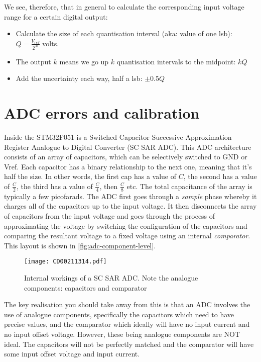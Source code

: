We see, therefore, that in general to calculate the corresponding input voltage range for a certain digital output:
\begin{itemize}
  \item Calculate the size of each quantisation interval (aka: value of one lsb): \(Q = \frac{V_{ref}}{2^M}\) volts.
  \item The output \(k\) means we go up \(k\) quantisation intervals to the midpoint: \(kQ\)
  \item Add the uncertainty each way, half a lsb: \(\pm 0.5Q\)
\end{itemize}

\section{ADC errors and calibration}
Inside the STM32F051 is a Switched Capacitor Successive Approximation Register Analogue to Digital Converter (SC SAR ADC). 
This ADC architecture consists of an array of capacitors, which can be selectively switched to GND or Vref. 
Each capacitor has a binary relationship to the next one, meaning that it's half the size. 
In other words, the first cap has a value of \(C\), the second has a value of \(\frac{C}{2}\), the third has a value of \(\frac{C}{4}\), then \(\frac{C}{8}\) etc.
The total capacitance of the array is typically a few picofarads. 
The ADC first goes through a \emph{sample} phase whereby it charges all of the capacitors up to the input voltage. It then disconnects the array of capacitors from the input voltage and goes through the process of approximating the voltage by switching the configuration of the capacitors and comparing the resultant voltage to a fixed voltage using an internal \emph{comparator}. This layout is shown in \autoref{fig:adc-component-level}. 

\begin{figure}
\centering
\texttt{[image: CD00211314.pdf]}
\caption{Internal workings of a SC SAR ADC. Note the analogue components: capacitors and comparator}
\label{fig:adc-component-level}
\end{figure}

The key realisation you should take away from this is that an ADC involves the use of analogue components, specifically the capacitors which need to have precise values, and the comparator which ideally will have no input current and no input offset voltage. However, these being analogue components are NOT ideal. The capacitors will not be perfectly matched and the comparator will have some input offset voltage and input current.

